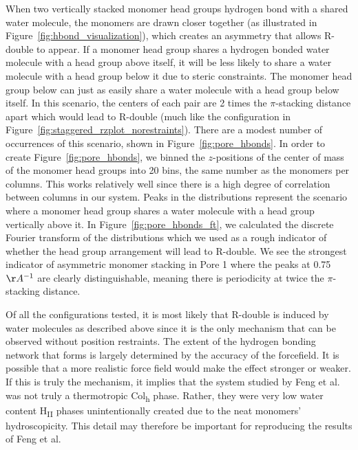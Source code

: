 \documentclass[journal=jpcbfk,manuscript=article]{achemso}
\begin{document}
  When two vertically stacked monomer head groups hydrogen bond with a shared water 
  molecule, the monomers are drawn closer together (as illustrated in 
  Figure~\ref{fig:hbond_visualization}), which creates an asymmetry that allows 
  R-double to appear. If a monomer head group shares a hydrogen bonded water molecule
  with a head group above itself, it will be less likely to share a water molecule 
  with a head group below it due to steric constraints. The monomer head group below
  can just as easily share a water molecule with a head group below itself. In this scenario,
  the centers of each pair are 2 times the $\pi$-stacking distance apart which would
  lead to R-double (much like the configuration in Figure~\ref{fig:staggered_rzplot_norestraints}). There are
  a modest number of occurrences of this scenario, shown in Figure~\ref{fig:pore_hbonds}. 
  In order to create Figure~\ref{fig:pore_hbonds}, we binned the $z$-positions of the
  center of mass of the monomer head groups into 20 bins, the same number as the monomers
  per columns. This works relatively well since there is a high degree of correlation between
  columns in our system. Peaks in the distributions represent the scenario where a monomer head group
  shares a water molecule with a head group vertically above it. In Figure~\ref{fig:pore_hbonds_ft},
  we calculated the discrete Fourier transform of the distributions which we used as a rough 
  indicator of whether the head group arrangement will lead to R-double. We see the 
  strongest indicator of asymmetric monomer stacking in Pore 1 where the peaks at 
  0.75 $\AA^{-1}$ are clearly distinguishable, meaning there is periodicity at twice
  the $\pi$-stacking distance.
  
  Of all the configurations tested, it is most likely that R-double is induced by water
  molecules as described above since it is the only mechanism that can be observed without
  position restraints. The extent of the hydrogen bonding network that forms is largely 
  determined by the accuracy of the forcefield. It is possible that a more realistic force
  field would make the effect stronger or weaker. If this is truly the mechanism, it implies
  that the system studied by Feng et al.\cite{feng_scalable_2014,feng_thin_2016} was not 
  truly a thermotropic Col\textsubscript{h} phase. Rather, they were very low water content
  H\textsubscript{II} phases unintentionally created due to the neat monomers' hydroscopicity.
  This detail may therefore be important for reproducing the results of Feng et al.
\end{document}
